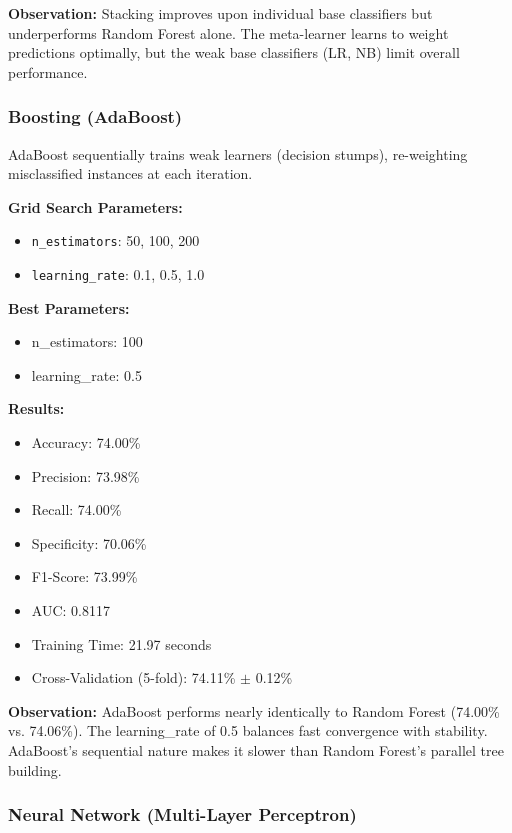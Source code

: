 \documentclass[12pt,man]{apa7}
\begin{document}
\textbf{Observation:} Stacking improves upon individual base classifiers but underperforms Random Forest alone. The meta-learner learns to weight predictions optimally, but the weak base classifiers (LR, NB) limit overall performance.

\subsubsection{Boosting (AdaBoost)}

AdaBoost sequentially trains weak learners (decision stumps), re-weighting misclassified instances at each iteration.

\textbf{Grid Search Parameters:}
\begin{itemize}
    \item \texttt{n\_estimators}: 50, 100, 200
    \item \texttt{learning\_rate}: 0.1, 0.5, 1.0
\end{itemize}

\textbf{Best Parameters:}
\begin{itemize}
    \item n\_estimators: 100
    \item learning\_rate: 0.5
\end{itemize}

\textbf{Results:}
\begin{itemize}
    \item Accuracy: 74.00\%
    \item Precision: 73.98\%
    \item Recall: 74.00\%
    \item Specificity: 70.06\%
    \item F1-Score: 73.99\%
    \item AUC: 0.8117
    \item Training Time: 21.97 seconds
    \item Cross-Validation (5-fold): 74.11\% $\pm$ 0.12\%
\end{itemize}

\textbf{Observation:} AdaBoost performs nearly identically to Random Forest (74.00\% vs. 74.06\%). The learning\_rate of 0.5 balances fast convergence with stability. AdaBoost's sequential nature makes it slower than Random Forest's parallel tree building.

\subsubsection{Neural Network (Multi-Layer Perceptron)}
\end{document}

